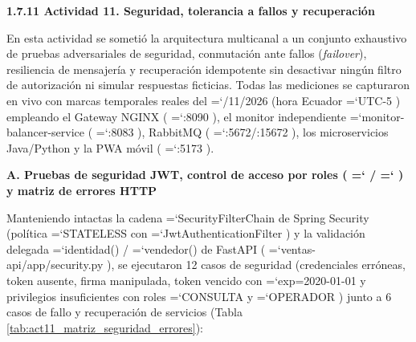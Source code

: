 \documentclass[11pt,a4paper]{article}
\makeatletter
\newcommand{\FloatBarrier}{%
  \par
  \ifx\@deferlist\@empty\else
    \clearpage
  \fi
}
\renewcommand{\_}{\oldunderscore\allowbreak}
\DeclareRobustCommand{\texttt}[1]{%
  {\upshape\ttfamily\fontsize{9}{10.8}\selectfont\hyphenchar\font=`\-\relax #1}%
}
\makeatother
\begin{document}
\vspace{0.4cm}
\FloatBarrier
\noindent\textbf{1.7.11 Actividad 11. Seguridad, tolerancia a fallos y recuperación}

\vspace{0.2cm}
\noindent En esta actividad se sometió la arquitectura multicanal a un conjunto exhaustivo de pruebas adversariales de seguridad, conmutación ante fallos (\textit{failover}), resiliencia de mensajería y recuperación idempotente sin desactivar ningún filtro de autorización ni simular respuestas ficticias. Todas las mediciones se capturaron en vivo con marcas temporales reales del \texttt{23/11/2026} (hora Ecuador \texttt{UTC-5}) empleando el Gateway NGINX (\texttt{:8090}), el monitor independiente \texttt{monitor-balancer-service} (\texttt{:8083}), RabbitMQ (\texttt{:\allowbreak{}5672/\allowbreak{}:\allowbreak{}15672}), los microservicios Java/Python y la PWA móvil (\texttt{:5173}).

\vspace{0.2cm}
\noindent\textbf{A. Pruebas de seguridad JWT, control de acceso por roles (\texttt{401}/\texttt{403}) y matriz de errores HTTP}

\noindent Manteniendo intactas la cadena \texttt{SecurityFilterChain} de Spring Security (política \texttt{STATELESS} con \texttt{JwtAuthenticationFilter}) y la validación delegada \texttt{identidad()}/\texttt{vendedor()} de FastAPI (\texttt{ventas-api/\allowbreak{}app/\allowbreak{}security.\allowbreak{}py}), se ejecutaron 12 casos de seguridad (credenciales erróneas, token ausente, firma manipulada, token vencido con \texttt{exp=\allowbreak{}2020-01-01} y privilegios insuficientes con roles \texttt{CONSULTA} y \texttt{OPERADOR}) junto a 6 casos de fallo y recuperación de servicios (Tabla \ref{tab:act11_matriz_seguridad_errores}):
\end{document}
